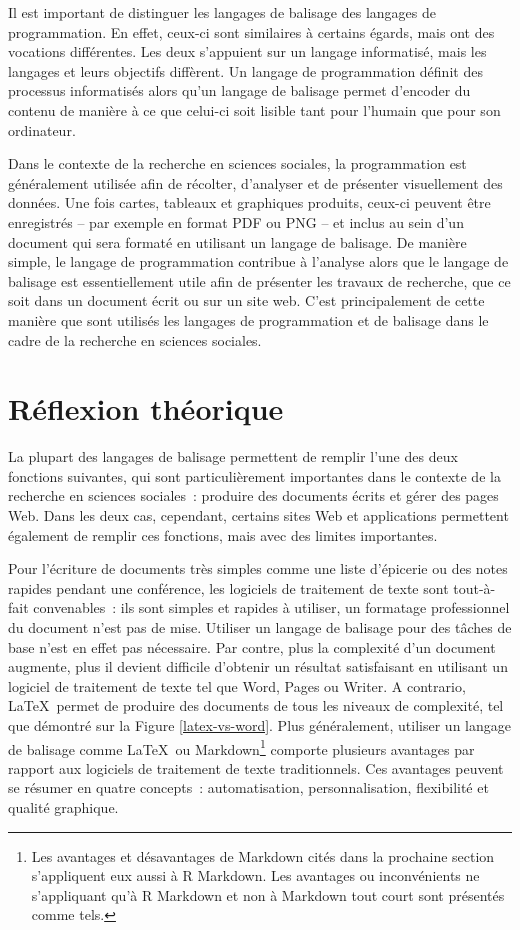 \documentclass[
  letterpaper,
  DIV=11,
  numbers=noendperiod]{scrreprt}
\begin{document}
Il est important de distinguer les langages de balisage des langages de
programmation. En effet, ceux-ci sont similaires à certains égards, mais
ont des vocations différentes. Les deux s'appuient sur un langage
informatisé, mais les langages et leurs objectifs diffèrent. Un langage
de programmation définit des processus informatisés alors qu'un langage
de balisage permet d'encoder du contenu de manière à ce que celui-ci
soit lisible tant pour l'humain que pour son ordinateur.

Dans le contexte de la recherche en sciences sociales, la programmation
est généralement utilisée afin de récolter, d'analyser et de présenter
visuellement des données. Une fois cartes, tableaux et graphiques
produits, ceux-ci peuvent être enregistrés -- par exemple en format PDF
ou PNG -- et inclus au sein d'un document qui sera formaté en utilisant
un langage de balisage. De manière simple, le langage de programmation
contribue à l'analyse alors que le langage de balisage est
essentiellement utile afin de présenter les travaux de recherche, que ce
soit dans un document écrit ou sur un site web. C'est principalement de
cette manière que sont utilisés les langages de programmation et de
balisage dans le cadre de la recherche en sciences sociales.

\hypertarget{ruxe9flexion-thuxe9orique-1}{%
\section{Réflexion théorique}\label{ruxe9flexion-thuxe9orique-1}}

La plupart des langages de balisage permettent de remplir l'une des deux
fonctions suivantes, qui sont particulièrement importantes dans le
contexte de la recherche en sciences sociales~: produire des documents
écrits et gérer des pages Web. Dans les deux cas, cependant, certains
sites Web et applications permettent également de remplir ces fonctions,
mais avec des limites importantes.

Pour l'écriture de documents très simples comme une liste d'épicerie ou
des notes rapides pendant une conférence, les logiciels de traitement de
texte sont tout-à-fait convenables~: ils sont simples et rapides à
utiliser, un formatage professionnel du document n'est pas de mise.
Utiliser un langage de balisage pour des tâches de base n'est en effet
pas nécessaire. Par contre, plus la complexité d'un document augmente,
plus il devient difficile d'obtenir un résultat satisfaisant en
utilisant un logiciel de traitement de texte tel que Word, Pages ou
Writer. A contrario, \LaTeX~permet de produire des documents de tous les
niveaux de complexité, tel que démontré sur la Figure
\ref{latex-vs-word}. Plus généralement, utiliser un langage de balisage
comme \LaTeX~ou Markdown\footnote{Les avantages et désavantages de
  Markdown cités dans la prochaine section s'appliquent eux aussi à R
  Markdown. Les avantages ou inconvénients ne s'appliquant qu'à R
  Markdown et non à Markdown tout court sont présentés comme tels.}
comporte plusieurs avantages par rapport aux logiciels de traitement de
texte traditionnels. Ces avantages peuvent se résumer en quatre
concepts~: automatisation, personnalisation, flexibilité et qualité
graphique.
\end{document}
